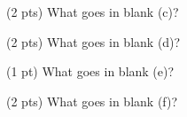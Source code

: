 \begin{prob}[(11 pts)]
\begin{subprobset}
\begin{subprob}
\begin{responsebox}{0.5in}
    
\end{responsebox}
   
\end{subprob}

\begin{subprob}(2 pts) What goes in blank (c)?






   
\end{subprob}

\begin{subprob}(2 pts) What goes in blank (d)?

\begin{responsebox}{0.5in}
    
\end{responsebox}

\end{subprob}

\begin{subprob}(1 pt) What goes in blank (e)?

\bubble{\texttt{>}}
\bubble{\texttt{>=}}
\bubble{\texttt{<}}
\bubble{\texttt{<=}}
\bubble{\texttt{==}}
\bubble{\texttt{!=}}

\end{subprob}

\begin{subprob}(2 pts) What goes in blank (f)?

\begin{responsebox}{0.5in}
    
\end{responsebox}

\end{subprob}
    
\end{subprobset}


\end{prob}

